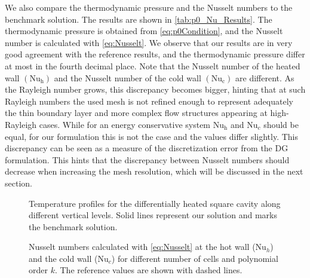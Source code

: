 We also compare the thermodynamic pressure and the Nusselt numbers to the benchmark solution. The results are shown in \cref{tab:p0_Nu_Results}. The thermodynamic pressure is obtained from \cref{eq:p0Condition}, and the Nusselt number is calculated with \cref{eq:Nusselt}. We observe that our results are in very good agreement with the reference results, and the thermodynamic pressure differ at most in the fourth decimal place. Note that the Nusselt number of the heated  wall $(\text{Nu}_\text{h})$ and the Nusselt number of the cold wall $(\text{Nu}_\text{c})$ are different.  As the Rayleigh number grows, this discrepancy becomes bigger, hinting that at such Rayleigh numbers the used mesh is not refined enough  to represent adequately the thin boundary layer and more complex flow structures appearing at high-Rayleigh cases. While for an energy conservative system $\text{Nu}_\text{h}$ and $\text{Nu}_c$ should be equal, for our formulation this is not the case and the values differ slightly. This discrepancy can be seen as a measure of the discretization error from the DG formulation.\cite{kleinHighorderDiscontinuousGalerkin2016} This hints that the discrepancy between Nusselt numbers should decrease when increasing the mesh resolution, which will be discussed in the next section.

\begin{figure}[b!]
	\centering
	\pgfplotsset{width=0.20\textwidth, compat=1.3}
	\caption{Temperature profiles for the differentially heated square cavity along different vertical levels. Solid lines represent our solution and marks the benchmark solution. \cite{vierendeelsBenchmarkSolutionsNatural2003}}
	\label{fig:TempProfile}
\end{figure}

\begin{figure}[b!]
	\centering
	\caption{Nusselt numbers calculated with \cref{eq:Nusselt} at the hot wall ($\text{Nu}_h$) and the cold wall ($\text{Nu}_c$) for different number of cells and polynomial order $k$. The reference values\cite{vierendeelsBenchmarkSolutionsNatural2003} are shown with dashed lines.}\label{fig:NusseltStudy}
\end{figure}

